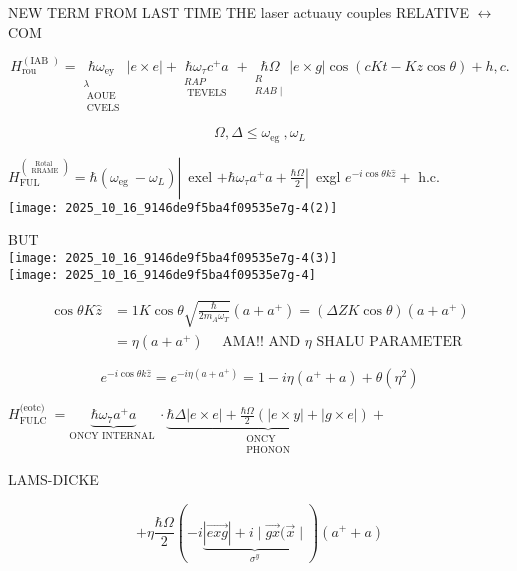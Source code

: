 NEW TERM FROM LAST TIME THE laser actuauy couples RELATIVE $\longleftrightarrow$ COM

$$
H_{\text {rou }}^{(\text {IAB })}=\underset{\substack{\lambda \\ \text { AOUE } \\ \text { CVELS }}}{\hbar \omega_{\text {ey }}}|e \times e|+\underset{\substack{R A P \\ \text { TEVELS }}}{\hbar \omega_{\tau} c^{+} a}+\underset{\substack{R \\ R A B \mid}}{\hbar \Omega}|e \times g| \cos (c K t-K z \cos \theta)+h, c .
$$

$$
\Omega, \Delta \leqslant \omega_{\text {eg }}, \omega_{L}
$$

$\left.H_{\text {FUL }}^{\binom{\text {Rotal }}{\text { RRAME }}}=\hbar\left(\omega_{\text {eg }}-\omega_{L}\right) \right\rvert\,$ exel $\left.+\hbar \omega_{\tau} a^{+} a+\frac{\hbar \Omega}{2} \right\rvert\,$ exgl $e^{-i \cos \theta k \hat{z}}+$ h.c.\\
\texttt{[image: 2025\_10\_16\_9146de9f5ba4f09535e7g-4(2)]}

BUT\\
\texttt{[image: 2025\_10\_16\_9146de9f5ba4f09535e7g-4(3)]}\\
\texttt{[image: 2025\_10\_16\_9146de9f5ba4f09535e7g-4]}

$$
\begin{aligned}
\cos \theta K \hat{z} & =1 K \cos \theta \sqrt{\frac{\hbar}{2 m_{A} \omega_{T}}}\left(a+a^{+}\right)=(\Delta Z K \cos \theta)\left(a+a^{+}\right) \\
& =\eta\left(a+a^{+}\right) \quad \text { AMA!! AND } \eta \text { SHALU PARAMETER }
\end{aligned}
$$

$$
e^{-i \cos \theta k \hat{z}}=e^{-i \eta\left(a+a^{+}\right)}=1-i \eta\left(a^{+}+a\right)+\theta\left(\eta^{2}\right)
$$

$H_{\text {FULC }}^{\text {(eotc) }}=\underbrace{\hbar \omega_{7} a^{+} a}_{\text {ONCY INTERNAL }} \cdot \underbrace{\hbar \Delta|e \times e|+\frac{\hbar \Omega}{2}(|e \times y|+|g \times e|)}_{\substack{\text { ONCY } \\ \text { PHONON }}}+$

LAMS-DICKE

$$
+\eta \frac{\hbar \Omega}{2}(-i \underbrace{|\overrightarrow{e xg}|+i \mid \overrightarrow{g x}(\vec{x} \mid}_{\sigma^{y}})\left(a^{+}+a\right)
$$


